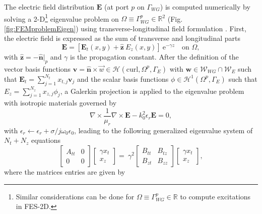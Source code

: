 The electric field distribution $\mathbf{E}$ (at port $p$ on $\Gamma_{WG}$) is computed numerically by solving a \mbox{2-D}\footnote{Similar considerations can be done for $\Omega \equiv \Gamma_{WG}^p \in \mathbb{R}$ to compute excitations in FES-2D.} eigenvalue problem on $\Omega \equiv \Gamma_{WG}^p \in \mathbb{R}^2$ (Fig. \ref{fig:FEMproblemEigen}) using transverse-longitudinal field formulation \cite{zhu2006multigrid}. First, the electric field is expressed as the sum of transverse and longitudinal parts
\begin{equation}
\mathbf{E} = [\mathbf{E}_{t}(x,y) + \hat{\mathbf{z}} \ E_{z}(x,y)] \ \text{e}^{-\gamma z} \quad \text{on } \Omega,
\end{equation}
%
\noindent with $\hat{\mathbf{z}} = -\hat{\mathbf{n}}|_p$ and $\gamma$ is the propagation constant. After the definition of the vector basis functions $\mathbf{v} = \hat{\mathbf{n}}\times\vec{w} \in \mathcal{H}(\mathrm{curl}, \Omega^p, \Gamma_E)$ with $ \mathbf{w} \in \mathcal{W}_{WG} \cap \mathcal{W}_{E}$ such that $\mathbf{E}_{t} = \sum_{j=1}^{N_t} x_{t,j} \mathbf{v}_j$ and the scalar basis functions $\phi \in \mathcal{H}^1(\Omega^p, \Gamma_E)$ such that $E_{z} = \sum_{j=1}^{N_z} x_{z,j} \phi_j$, a Galerkin projection is applied to the eigenvalue problem with isotropic materials governed by
%
\begin{equation}
\nabla \times \frac{1}{\mu_r} \nabla \times \mathbf{E} - {k}_0^2 {\epsilon}_r \mathbf{E} = 0,
\end{equation}
%
\noindent with $\epsilon_r \leftarrow \epsilon_r + {\sigma}/{j\omega_0\epsilon_0}$, leading to the following generalized eigenvalue system of $N_t + N_z$ equations \cite{zhu2006multigrid,jiao2008fast}
\begin{equation}
\label{eq:eigen}
\begin{bmatrix}
{A}_{tt} &0\\
0 &0
\end{bmatrix}
\begin{bmatrix}
\gamma x_{t}\\
x_{z}
\end{bmatrix} = \ \gamma^2
\begin{bmatrix}
{B}_{tt} &{B}_{tz}\\
{B}_{zt} &{B}_{zz}
\end{bmatrix}
\begin{bmatrix}
\gamma x_{t}\\
x_{z}
\end{bmatrix},
\end{equation}
%
\noindent where the matrices entries are given by

